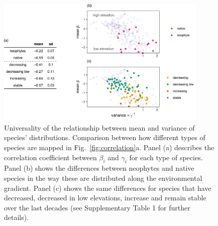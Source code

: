 \documentclass[11pt, a4paper]{article}
\begin{document}
\begin{figure}[ht]
  \centering
    \includegraphics[width=0.9\textwidth]{figures/means-Rapopor}
    	  \vspace{0.1cm}
	   \caption{Universality of the relationship between mean and variance of species' distributions. Comparison between how different types of species are mapped in Fig.~\ref{fig:correlation}a. Panel (a) describes the correlation coefficient between $\beta_i$ and $\gamma_i$ for each type of species. Panel (b) shows the differences between neophytes and native species in the way these are distributed along the environmental gradient. Panel (c) shows the same differences for species that have decreased, decreased in low elevations, increase and remain stable over the last decades (see Supplementary Table 1 for further details).}
      \label{fig:universality}
\end{figure}




\end{document}
